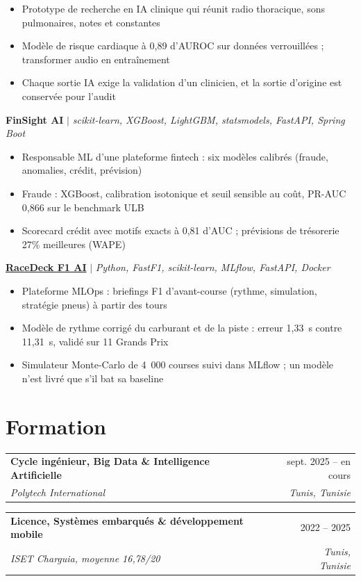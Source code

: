 \documentclass[a4paper,11pt]{article}
\makeatletter
\newcommand{\role}[4]{%
  \begin{tabular*}{\linewidth}{l@{\extracolsep{\fill}}r}
    \textbf{#1} & #2 \\
    \textit{#3} & \textit{#4} \\
  \end{tabular*}\par}
\newenvironment{points}{\begin{itemize}[leftmargin=1.4em,itemsep=1pt,topsep=2pt,parsep=0pt]\small}{\end{itemize}\vspace{4pt}}
\newcommand{\proj}[2]{\textbf{#1} $|$ \textit{\small #2}\par}
\newcommand{\gap}{\vspace{4pt}}
\makeatother
\begin{document}
\begin{points}
  \item Prototype de recherche en IA clinique qui réunit radio thoracique, sons pulmonaires, notes et constantes
  \item Modèle de risque cardiaque à 0,89 d'AUROC sur données verrouillées ; transformer audio en entraînement
  \item Chaque sortie IA exige la validation d'un clinicien, et la sortie d'origine est conservée pour l'audit
\end{points}
\proj{FinSight AI}{scikit-learn, XGBoost, LightGBM, statsmodels, FastAPI, Spring Boot}
\begin{points}
  \item Responsable ML d'une plateforme fintech : six modèles calibrés (fraude, anomalies, crédit, prévision)
  \item Fraude : XGBoost, calibration isotonique et seuil sensible au coût, PR-AUC 0,866 sur le benchmark ULB
  \item Scorecard crédit avec motifs exacts à 0,81 d'AUC ; prévisions de trésorerie 27\% meilleures (WAPE)
\end{points}
\proj{\href{https://github.com/ChedyKorbi/RACEDECK_F1_AI}{RaceDeck F1 AI}}{Python, FastF1, scikit-learn, MLflow, FastAPI, Docker}
\begin{points}
  \item Plateforme MLOps : briefings F1 d'avant-course (rythme, simulation, stratégie pneus) à partir des tours
  \item Modèle de rythme corrigé du carburant et de la piste : erreur 1,33~s contre 11,31~s, validé sur 11 Grands Prix
  \item Simulateur Monte-Carlo de 4~000 courses suivi dans MLflow ; un modèle n'est livré que s'il bat sa baseline
\end{points}

\section{Formation}
\role{Cycle ingénieur, Big Data \& Intelligence Artificielle}{sept. 2025 -- en cours}{Polytech International}{Tunis, Tunisie}
\gap
\role{Licence, Systèmes embarqués \& développement mobile}{2022 -- 2025}{ISET Charguia, moyenne 16,78/20}{Tunis, Tunisie}
\end{document}
